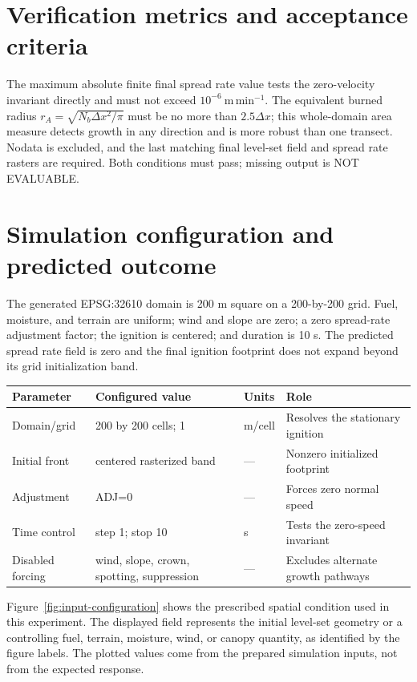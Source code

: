 \section{Verification metrics and acceptance criteria}

The maximum absolute finite final spread rate value tests the zero-velocity invariant directly and must not exceed \(10^{-6}~\mathrm{m\,min^{-1}}\). The equivalent burned radius \(r_A=\sqrt{N_b\Delta x^2/\pi}\) must be no more than \(2.5\Delta x\); this whole-domain area measure detects growth in any direction and is more robust than one transect. Nodata is excluded, and the last matching final level-set field and spread rate rasters are required. Both conditions must pass; missing output is NOT EVALUABLE.

\section{Simulation configuration and predicted outcome}

The generated EPSG:32610 domain is 200 m square on a 200-by-200 grid. Fuel, moisture, and terrain are uniform; wind and slope are zero; a zero spread-rate adjustment factor; the ignition is centered; and duration is 10 s. The predicted spread rate field is zero and the final ignition footprint does not expand beyond its grid initialization band.

\begin{center}\begin{tabular}{p{}p{}p{}p{}}\toprule
Parameter & Configured value & Units & Role \\
\midrule Domain/grid & 200 by 200 cells; 1 & m/cell & Resolves the stationary ignition \\
Initial front & centered rasterized band & --- & Nonzero initialized footprint \\
Adjustment & ADJ=0 & --- & Forces zero normal speed \\
Time control & step 1; stop 10 & s & Tests the zero-speed invariant \\
Disabled forcing & wind, slope, crown, spotting, suppression & --- & Excludes alternate growth pathways \\
\bottomrule\end{tabular}\end{center}

Figure~\ref{fig:input-configuration} shows the prescribed spatial condition used in this experiment. The displayed field represents the initial level-set geometry or a controlling fuel, terrain, moisture, wind, or canopy quantity, as identified by the figure labels. The plotted values come from the prepared simulation inputs, not from the expected response.

